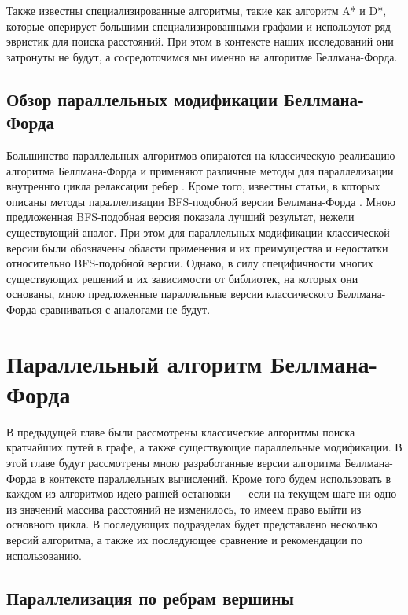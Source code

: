 Также известны специализированные алгоритмы, такие как алгоритм A* и D*, которые оперирует большими специализированными графами и используют ряд эвристик для поиска расстояний. При этом в контексте наших исследований они затронуты не будут, а сосредоточимся мы именно на алгоритме Беллмана-Форда.


\FloatBarrier
\subsection{Обзор параллельных модификации Беллмана-Форда}

Большинство параллельных алгоритмов опираются на классическую реализацию алгоритма Беллмана-Форда и применяют различные методы для параллелизации внутреннго цикла релаксации ребер \cite{COHEN}\cite{GAURAV}. Кроме того, известны статьи, в которых описаны методы параллелизации BFS-подобной версии Беллмана-Форда \cite{LIGRA}. Мною предложенная BFS-подобная версия показала лучший результат, нежели существующий аналог. При этом для параллельных модификации классической версии были обозначены области применения и их преимущества и недостатки относительно BFS-подобной версии. Однако, в силу специфичности многих существующих решений и их зависимости от библиотек, на которых они основаны, мною предложенные параллельные версии классического Беллмана-Форда сравниваться с аналогами не будут. 


\FloatBarrier
\section{Параллельный алгоритм Беллмана-Форда}

В предыдущей главе были рассмотрены классические алгоритмы поиска кратчайших путей в графе, а также существующие параллельные модификации. В этой главе будут рассмотрены мною разработанные версии алгоритма Беллмана-Форда в контексте параллельных вычислений. Кроме того будем использовать в каждом из алгоритмов идею ранней остановки --- если на текущем шаге ни одно из значений массива расстояний не изменилось, то имеем право выйти из основного цикла. В последующих подразделах будет представлено несколько версий алгоритма, а также их последующее сравнение и рекомендации по использованию.  

\FloatBarrier
\subsection{Параллелизация по ребрам вершины}

